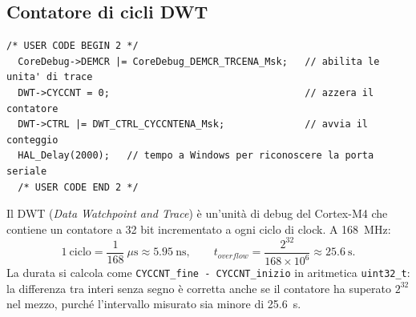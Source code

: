 \documentclass[11pt,a4paper]{article}
\newcommand{\code}[1]{\texttt{\small #1}}
\begin{document}
\subsection{Contatore di cicli DWT}
\begin{lstlisting}[style=c]
  /* USER CODE BEGIN 2 */
  CoreDebug->DEMCR |= CoreDebug_DEMCR_TRCENA_Msk;   // abilita le unita' di trace
  DWT->CYCCNT = 0;                                  // azzera il contatore
  DWT->CTRL |= DWT_CTRL_CYCCNTENA_Msk;              // avvia il conteggio
  HAL_Delay(2000);   // tempo a Windows per riconoscere la porta seriale
  /* USER CODE END 2 */
\end{lstlisting}
Il DWT (\emph{Data Watchpoint and Trace}) è un'unità di debug del Cortex-M4 che contiene un contatore
a 32 bit incrementato a ogni ciclo di clock. A 168~MHz:
\begin{equation}
1\ \text{ciclo} = \frac{1}{168}\ \mu\text{s}\approx 5.95\ \text{ns}, \qquad
t_{overflow} = \frac{2^{32}}{168\times10^6} \approx 25.6\ \text{s}.
\end{equation}
La durata si calcola come \code{CYCCNT\_fine - CYCCNT\_inizio} in aritmetica \code{uint32\_t}:
la differenza tra interi senza segno è corretta anche se il contatore ha superato $2^{32}$ nel mezzo,
purché l'intervallo misurato sia minore di 25.6~s.
\end{document}
